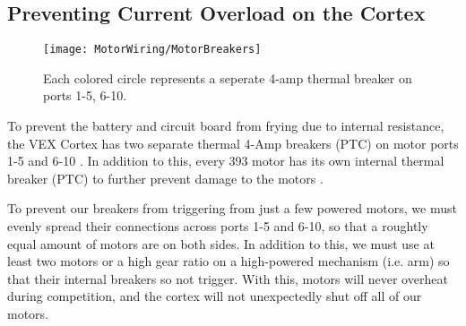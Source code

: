 \subsection{Preventing Current Overload on the Cortex}

\begin{figure}[h]
    \centering
    \texttt{[image: MotorWiring/MotorBreakers]}
    \caption{
        Each colored circle represents a seperate 4-amp thermal breaker on ports 1-5, 6-10.
    }
\end{figure}

To prevent the battery and circuit board from frying due to internal resistance, the VEX Cortex has two separate thermal 4-Amp breakers (PTC) on motor ports 1-5 and 6-10 \cite{CortexBreakers}. In addition to this, every 393 motor has its own internal thermal breaker (PTC) to further prevent damage to the motors \cite{MotorBreakers}.

To prevent our breakers from triggering from just a few powered motors, we must evenly spread their connections across ports 1-5 and 6-10, so that a roughtly equal amount of motors are on both sides. In addition to this, we must use at least two motors or a high gear ratio on a high-powered mechanism (i.e. arm) so that their internal breakers so not trigger. With this, motors will never overheat during competition, and the cortex will not unexpectedly shut off all of our motors.
